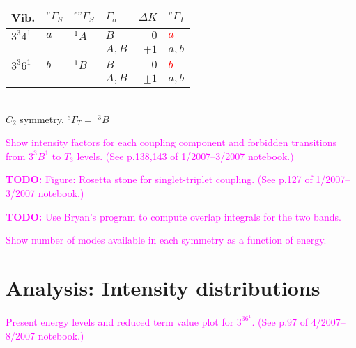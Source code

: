 \documentclass[12pt]{mitthesis}
\newcommand{\TODO} [1]{\textcolor{magenta}{\textbf{TODO:} #1}}
\newcommand{\POINT}[1]{\textcolor{magenta}{#1}}
\begin{document}
\begin{table}
  \begin{tabular}{llllrl}
    Vib.
    & $^{v}\Gamma_S$ & $^{ev}\Gamma_S$ & $\Gamma_\sigma$ & $\Delta K$ & $^{v}\Gamma_T$ \\
    \toprule

    

    $3^3 4^1$ 
    & $a$ & $^{1}A$ & $B$ & $0$ & \textcolor{red}{$a$} \\
    & & & $A, B$ & $\pm1$ & $a, b$ \\[10pt]

    $3^3 6^1$ 
    & $b$ & $^{1}B$ & $B$ & $0$ & \textcolor{red}{$b$} \\
    & & & $A, B$ & $\pm1$ & $a, b$ \\

  \end{tabular}\\[5mm]

  $C_{2}$ symmetry, $^{e}\Gamma_T =$ $^{3}B$
\end{table}

\POINT{Show intensity factors for each coupling component and
  forbidden transitions from $3^3B^1$ to $T_3$ levels.  (See p.138,143 of
  1/2007--3/2007 notebook.)}

\TODO{Figure: Rosetta stone for singlet-triplet coupling.  (See p.127
  of 1/2007--3/2007 notebook.)}

\TODO{Use Bryan's program to compute overlap integrals for the two bands.}

\POINT{Show number of modes available in each symmetry as a function
  of energy.}

\section{Analysis: Intensity distributions}

\POINT{Present energy levels and reduced term value plot for $3^36^1$.
  (See p.97 of 4/2007--8/2007 notebook.)} 
\end{document}
